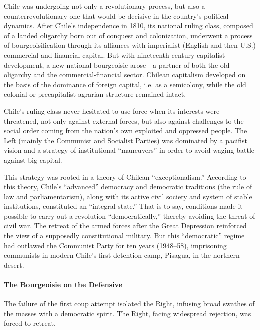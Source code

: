 Chile was undergoing not only a revolutionary process, but also a counterrevolutionary one that would be decisive in the country's political dynamics. After Chile's independence in 1810, its national ruling class, composed of a landed oligarchy born out of conquest and colonization, underwent a process of bourgeoisification through its alliances with imperialist (English and then U.S.) commercial and financial capital. But with nineteenth-century capitalist development, a new national bourgeoisie arose---a partner of both the old oligarchy and the commercial-financial sector. Chilean capitalism developed on the basis of the dominance of foreign capital, i.e. as a semicolony, while the old colonial or precapitalist agrarian structure remained intact.

Chile's ruling class never hesitated to use force when its interests were threatened, not only against external forces, but also against challenges to the social order coming from the nation's own exploited and oppressed people. The Left (mainly the Communist and Socialist Parties) was dominated by a pacifist vision and a strategy of institutional ``maneuvers'' in order to avoid waging battle against big capital.

This strategy was rooted in a theory of Chilean ``exceptionalism.'' According to this theory, Chile's ``advanced'' democracy and democratic traditions (the rule of law and parliamentarism), along with its active civil society and system of stable institutions, constituted an ``integral state.'' That is to say, conditions made it possible to carry out a revolution ``democratically,'' thereby avoiding the threat of civil war. The retreat of the armed forces after the Great Depression reinforced the view of a supposedly constitutional military. But this ``democratic'' regime had outlawed the Communist Party for ten years (1948--58), imprisoning communists in modern Chile's first detention camp, Pisagua, in the northern desert.

\paragraph{The Bourgeoisie on the Defensive}

The failure of the first coup attempt isolated the Right, infusing broad swathes of the masses with a democratic spirit. The Right, facing widespread rejection, was forced to retreat.

